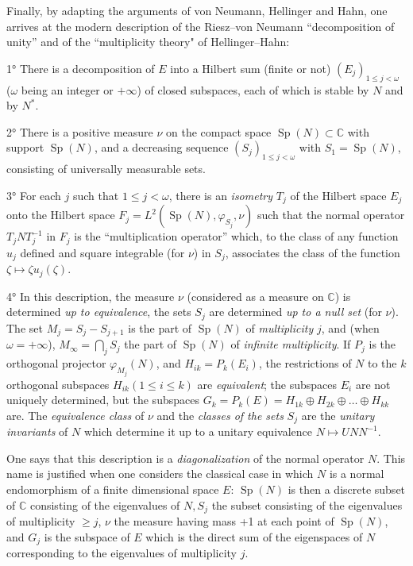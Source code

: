 \documentclass[12pt,a4paper,leqno,twoside]{extbook}
\newcommand{\C}{\mathbb{C}}
\newcommand{\spec}{\operatorname{Sp}}
\begin{document}
Finally, by adapting the arguments of von Neumann, Hellinger and Hahn, one arrives at the modern description of the Riesz--von Neumann ``decomposition of unity'' and of the ``multiplicity theory" of Hellinger--Hahn:

1° There is a decomposition of \(E\) into a Hilbert sum (finite or not) \((E_j)_{1 \leq j < \omega}\) (\(\omega\) being an integer or \(+\infty\)) of closed subspaces, each of which is stable by \(N\) and by \(N^*\).

2° There is a positive measure \(\nu\) on the compact space \(\spec(N) \subset \C\) with support \(\spec(N)\), and a decreasing sequence \((S_j)_{1 \leq j < \omega}\) with \(S_1 = \spec(N)\), consisting of universally measurable sets.

3° For each \(j\) such that \(1 \leq j < \omega\), there is an \emph{isometry} \(T_j\) of the Hilbert space \(E_j\) onto the Hilbert space \(F_j = L^2(\spec(N), \varphi_{S_j}, \nu)\) such that the normal operator \(T_j N T^{-1}_j\) in \(F_j\) is the ``multiplication operator'' which, to the class of any function \(u_j\) defined and square integrable (for \(\nu\)) in \(S_j\), associates the class of the function \(\zeta \mapsto \zeta u_j(\zeta)\).

4° In this description, the measure \(\nu\) (considered as a measure on \(\C\)) is determined \emph{up to equivalence}, the sets \(S_j\) are determined \emph{up to a null set} (for \(\nu\)). The set \(M_j = S_j - S_{j+1}\) is the part of \(\spec(N)\) of \emph{multiplicity} \(j\), and (when \(\omega = +\infty\)), \(M_\infty = \bigcap_j S_j\) the part of \(\spec(N)\) of \emph{infinite multiplicity}. If \(P_j\) is the orthogonal projector \(\varphi_{M_j}(N)\), and \(H_{ik} = P_k(E_i)\), the restrictions of \(N\) to the \(k\) orthogonal subspaces \(H_{ik} (1 \leq i \leq k)\) are \emph{equivalent}; the subspaces \(E_i\) are not uniquely determined, but the subspaces \(G_k = P_k(E) = H_{1k} \oplus H_{2k} \oplus \ldots \oplus H_{kk}\) are. The \emph{equivalence class} of \(\nu\) and the \emph{classes of the sets} \(S_j\) are the \emph{unitary invariants} of \(N\) which determine it up to a unitary equivalence \(N \mapsto U N N^{-1}\).

One says that this description is a \emph{diagonalization} of the normal operator \(N\). This name is justified when one considers the classical case in which \(N\) is a normal endomorphism of a finite dimensional space \(E\): \(\spec(N)\) is then a discrete subset of \(\C\) consisting of the eigenvalues of \(N, S_j\) the subset consisting of the eigenvalues of multiplicity \(\geq j\), \(\nu\) the measure having mass +1 at each point of \(\spec(N)\), and \(G_j\) is the subspace of \(E\) which is the direct sum of the eigenspaces of \(N\) corresponding to the eigenvalues of multiplicity \(j\).
\end{document}
